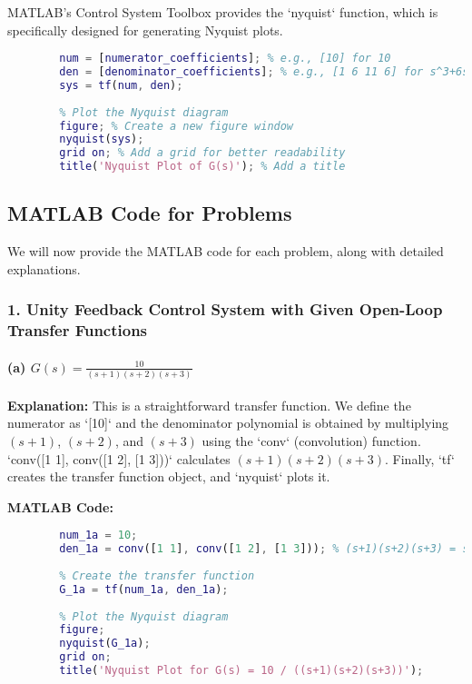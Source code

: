 \documentclass[a4paper,12pt]{article}
\begin{document}
	MATLAB's Control System Toolbox provides the `nyquist` function, which is specifically designed for generating Nyquist plots.
	
	\begin{lstlisting}[language=Matlab, caption=General MATLAB usage for Nyquist Plot]
		% Define the transfer function
		num = [numerator_coefficients]; % e.g., [10] for 10
		den = [denominator_coefficients]; % e.g., [1 6 11 6] for s^3+6s^2+11s+6
		sys = tf(num, den);
		
		% Plot the Nyquist diagram
		figure; % Create a new figure window
		nyquist(sys);
		grid on; % Add a grid for better readability
		title('Nyquist Plot of G(s)'); % Add a title
	\end{lstlisting}
	
	\subsection*{MATLAB Code for Problems}
	
	We will now provide the MATLAB code for each problem, along with detailed explanations.
	
	\subsubsection*{1. Unity Feedback Control System with Given Open-Loop Transfer Functions}
	
	\paragraph{(a) $G(s)=\frac{10}{(s+1)(s+2)(s+3)}$}
	\textbf{Explanation:}
	This is a straightforward transfer function. We define the numerator as `[10]` and the denominator polynomial is obtained by multiplying $(s+1)$, $(s+2)$, and $(s+3)$ using the `conv` (convolution) function. `conv([1 1], conv([1 2], [1 3]))` calculates $(s+1)(s+2)(s+3)$. Finally, `tf` creates the transfer function object, and `nyquist` plots it.
	
	\textbf{MATLAB Code:}
	\begin{lstlisting}[language=Matlab, caption=MATLAB Code for Problem 1(a)]
		% Define the numerator and denominator polynomials
		num_1a = 10;
		den_1a = conv([1 1], conv([1 2], [1 3])); % (s+1)(s+2)(s+3) = s^3 + 6s^2 + 11s + 6
		
		% Create the transfer function
		G_1a = tf(num_1a, den_1a);
		
		% Plot the Nyquist diagram
		figure;
		nyquist(G_1a);
		grid on;
		title('Nyquist Plot for G(s) = 10 / ((s+1)(s+2)(s+3))');
	\end{lstlisting}
	
\end{document}
